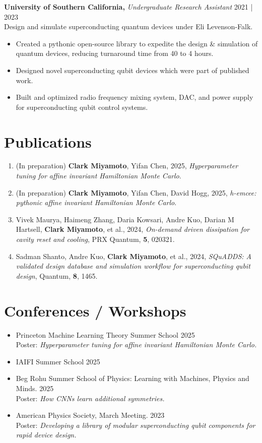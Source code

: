 \documentclass[a4paper,9pt]{extarticle}
\begin{document}
\noindent
\textbf{University of Southern California,} \textit{Undergraduate Research Assistant} \hfill 2021 | 2023\\
Design and simulate superconducting quantum devices under Eli Levenson-Falk.
\begin{itemize}
    \item Created a pythonic open-source library to expedite the design \& simulation of quantum devices, reducing turnaround time from 40 to 4 hours. 
    \item Designed novel superconducting qubit devices which were part of published work.
    \item Built and optimized radio frequency mixing system, DAC, and power supply for superconducting qubit control systems.
\end{itemize}


\section*{Publications}
\begin{enumerate}
    \item (In preparation) \textbf{Clark Miyamoto}, Yifan Chen, 2025, \emph{Hyperparameter tuning for affine invariant Hamiltonian Monte Carlo}.
    \item (In preparation) \textbf{Clark Miyamoto}, Yifan Chen, David Hogg, 2025, \emph{h-emcee: pythonic affine invariant Hamiltonian Monte Carlo}.
    
    \item Vivek Maurya, Haimeng Zhang, Daria Kowsari, Andre Kuo, Darian M Hartsell, \textbf{Clark Miyamoto}, et al., 2024, \emph{On-demand driven dissipation for cavity reset and cooling}, PRX Quantum, \textbf{5}, 020321. 
 
    \item Sadman Shanto, Andre Kuo, \textbf{Clark Miyamoto}, et al., 2024, \emph{SQuADDS: A validated design database and simulation workflow for superconducting qubit design}, Quantum, \textbf{8}, 1465.
\end{enumerate}

\section*{Conferences / Workshops}
\begin{itemize}
    \item Princeton Machine Learning Theory Summer School \hfill 2025\\
    \noindent Poster: \emph{Hyperparameter tuning for affine invariant Hamiltonian Monte Carlo.}
    \item IAIFI Summer School \hfill 2025
    \item Beg Rohu Summer School of Physics: Learning with Machines, Physics and Minds. \hfill 2025\\
    \noindent Poster: \emph{How CNNs learn additional symmetries.}
    \item American Physics Society, March Meeting. \hfill 2023\\
    Poster: \emph{Developing a library of modular superconducting qubit components for rapid device design.}
\end{itemize}
\end{document}
